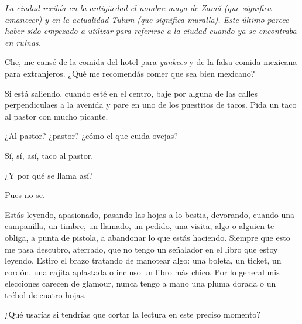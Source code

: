 \documentclass[12pt,twoside,openright,a5paper]{book}
\begin{document}
\vspace{0.5cm}
\hrulefill\hspace{0.2cm} \decofourleft\decofourright \hspace{0.2cm} \hrulefill
\vspace{0.5cm}

\emph{La ciudad recibía en la
antigüedad el nombre maya de Zamá (que significa amanecer) y
en la actualidad Tulum
(que significa muralla). Este último parece haber sido
empezado a utilizar para referirse a la ciudad cuando
ya se encontraba en ruinas.}


\vspace{0.5cm}
\hrulefill\hspace{0.2cm} \decofourleft\decofourright \hspace{0.2cm} \hrulefill
\vspace{0.5cm}

Che, me cansé de la comida del hotel para \emph{yankees} y de la falsa comida
mexicana para extranjeros. ¿Qué me recomendás comer que sea bien mexicano?

Si está saliendo, cuando esté en el centro, baje por alguna de las calles
perpendiculaes a la avenida y pare en uno de los puestitos de tacos. Pida
un taco al pastor con mucho picante.

¿Al pastor? ¿pastor? ¿cómo el que cuida ovejas?

Sí, sí, así, taco al pastor.

¿Y por qué se llama así?

Pues no se.


\vspace{0.5cm}
\hrulefill\hspace{0.2cm} \decofourleft\decofourright \hspace{0.2cm} \hrulefill
\vspace{0.5cm}

Estás leyendo, apasionado, pasando las hojas a lo bestia, devorando, cuando
una campanilla, un timbre, un llamado, un pedido, una visita, algo o alguien
te obliga, a punta de pistola, a abandonar lo que estás haciendo. Siempre
que esto me pasa descubro, aterrado, que no tengo un señalador en el libro
que estoy leyendo. Estiro el brazo tratando de manotear algo: una boleta, un
ticket, un cordón, una cajita aplastada o incluso un libro más chico. Por
lo general mis elecciones carecen de glamour, nunca tengo a mano una pluma
dorada o un trébol de cuatro hojas.

¿Qué usarías si tendrías que cortar la lectura en este preciso momento?
\end{document}
